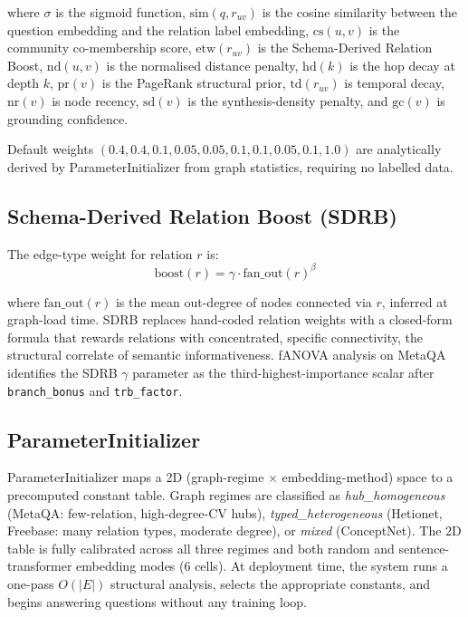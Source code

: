 \documentclass[11pt,a4paper]{article}
\begin{document}
where $\sigma$ is the sigmoid function, $\mathrm{sim}(q, r_{uv})$ is the
cosine similarity between the question embedding and the relation label embedding,
$\mathrm{cs}(u, v)$ is the community co-membership score, $\mathrm{etw}(r_{uv})$
is the Schema-Derived Relation Boost, $\mathrm{nd}(u, v)$ is the normalised
distance penalty, $\mathrm{hd}(k)$ is the hop decay at depth $k$,
$\mathrm{pr}(v)$ is the PageRank structural prior, $\mathrm{td}(r_{uv})$ is
temporal decay, $\mathrm{nr}(v)$ is node recency, $\mathrm{sd}(v)$ is the
synthesis-density penalty, and $\mathrm{gc}(v)$ is grounding confidence.

Default weights $(0.4, 0.4, 0.1, 0.05, 0.05, 0.1, 0.1, 0.05, 0.1, 1.0)$ are
analytically derived by ParameterInitializer from graph statistics, requiring no
labelled data.

\subsection{Schema-Derived Relation Boost (SDRB)}
\label{sec:sdrb}

The edge-type weight for relation $r$ is:
\begin{equation}
  \mathrm{boost}(r) = \gamma \cdot \mathrm{fan\_out}(r)^{\beta}
\end{equation}

where $\mathrm{fan\_out}(r)$ is the mean out-degree of nodes connected via $r$,
inferred at graph-load time. SDRB replaces hand-coded relation weights with a
closed-form formula that rewards relations with concentrated, specific
connectivity, the structural correlate of semantic informativeness.
fANOVA analysis on MetaQA identifies the SDRB $\gamma$ parameter as the
third-highest-importance scalar after \texttt{branch\_bonus} and \texttt{trb\_factor}.

\subsection{ParameterInitializer}
\label{sec:paraminit}

ParameterInitializer maps a 2D (graph-regime $\times$ embedding-method) space to
a precomputed constant table. Graph regimes are classified as
\textit{hub\_homogeneous} (MetaQA: few-relation, high-degree-CV hubs),
\textit{typed\_heterogeneous} (Hetionet, Freebase: many relation types, moderate
degree), or \textit{mixed} (ConceptNet). The 2D table is fully calibrated across
all three regimes and both random and sentence-transformer embedding modes
(6 cells). At deployment time, the system runs a one-pass $O(|E|)$ structural
analysis, selects the appropriate constants, and begins answering questions
without any training loop.
\end{document}
